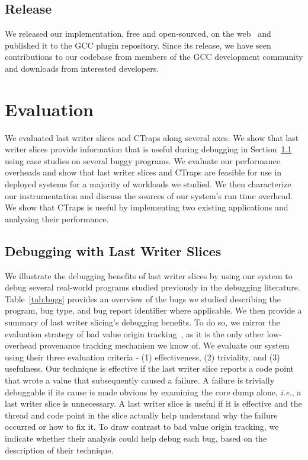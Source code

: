 \documentclass[preprint,9pt]{sigplanconf}
\newcommand{\ctraps}{CTraps\xspace}
\begin{document}
\subsection{Release}
We released our implementation, free and open-sourced, on the
web~\cite{withheldforanonymity} and published it to the GCC plugin repository.
Since its release, we have seen contributions to our codebase from members of
the GCC development community and downloads from interested developers.

\section{Evaluation}
\label{sec:eval}
We evaluated last writer slices and \ctraps along several axes.  We show that
last writer slices provide information that is useful during debugging in
Section~\ref{sec:eval:debugging} using case studies on several buggy programs.
We evaluate our performance overheads and show that last writer slices and
\ctraps are feasible for use in deployed systems for a majority of workloads we
studied.  We then characterize our instrumentation and discuss the sources of
our system's run time overhead.   We show that \ctraps is useful by
implementing two existing applications and analyzing their performance.    

\subsection{Debugging with Last Writer Slices}
\label{sec:eval:debugging}

We illustrate the debugging benefits of last writer slices by using our system
to debug several real-world programs studied previously in the debugging
literature.  Table~\ref{tab:bugs} provides an overview of the bugs we studied
describing the program, bug type, and bug report identifier where applicable.
We then provide a summary of last writer slicing's debugging benefits.  To do
so, we mirror the evaluation strategy of bad value origin
tracking~\cite{badapples}, as it is the only other low-overhead provenance
tracking mechanism we know of.  We evaluate our system using their three
evaluation criteria - (1) effectiveness, (2) triviality, and (3) usefulness.
Our technique is effective if the last writer slice reports a code point that
wrote a value that subsequently caused a failure.  A failure is trivially
debuggable if its cause is made obvious by examining the core dump alone, {\em
i.e.}, a last writer slice is unnecessary.  A last writer slice is useful if it
is effective and the thread and code point in the slice actually help
understand why the failure occurred or how to fix it.   To draw contrast to bad
value origin tracking, we indicate whether their analysis could help debug each
bug, based on the description of their technique.
\end{document}
